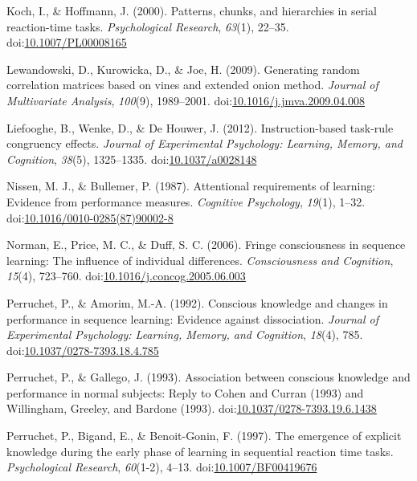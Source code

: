 \documentclass[man]{apa6}
\theoremstyle{definition}
\theoremstyle{definition}
\theoremstyle{definition}
\theoremstyle{remark}
\begin{document}
\hypertarget{ref-koch_patterns_2000}{}
Koch, I., \& Hoffmann, J. (2000). Patterns, chunks, and hierarchies in
serial reaction-time tasks. \emph{Psychological Research}, \emph{63}(1),
22--35.
doi:\href{https://doi.org/10.1007/PL00008165}{10.1007/PL00008165}

\hypertarget{ref-lewandowski_generating_2009}{}
Lewandowski, D., Kurowicka, D., \& Joe, H. (2009). Generating random
correlation matrices based on vines and extended onion method.
\emph{Journal of Multivariate Analysis}, \emph{100}(9), 1989--2001.
doi:\href{https://doi.org/10.1016/j.jmva.2009.04.008}{10.1016/j.jmva.2009.04.008}

\hypertarget{ref-liefooghe_instruction-based_2012}{}
Liefooghe, B., Wenke, D., \& De Houwer, J. (2012). Instruction-based
task-rule congruency effects. \emph{Journal of Experimental Psychology:
Learning, Memory, and Cognition}, \emph{38}(5), 1325--1335.
doi:\href{https://doi.org/10.1037/a0028148}{10.1037/a0028148}

\hypertarget{ref-nissen_attentional_1987}{}
Nissen, M. J., \& Bullemer, P. (1987). Attentional requirements of
learning: Evidence from performance measures. \emph{Cognitive
Psychology}, \emph{19}(1), 1--32.
doi:\href{https://doi.org/10.1016/0010-0285(87)90002-8}{10.1016/0010-0285(87)90002-8}

\hypertarget{ref-norman_fringe_2006}{}
Norman, E., Price, M. C., \& Duff, S. C. (2006). Fringe consciousness in
sequence learning: The influence of individual differences.
\emph{Consciousness and Cognition}, \emph{15}(4), 723--760.
doi:\href{https://doi.org/10.1016/j.concog.2005.06.003}{10.1016/j.concog.2005.06.003}

\hypertarget{ref-perruchet_conscious_1992}{}
Perruchet, P., \& Amorim, M.-A. (1992). Conscious knowledge and changes
in performance in sequence learning: Evidence against dissociation.
\emph{Journal of Experimental Psychology: Learning, Memory, and
Cognition}, \emph{18}(4), 785.
doi:\href{https://doi.org/10.1037/0278-7393.18.4.785}{10.1037/0278-7393.18.4.785}

\hypertarget{ref-perruchet_association_1993}{}
Perruchet, P., \& Gallego, J. (1993). Association between conscious
knowledge and performance in normal subjects: Reply to Cohen and Curran
(1993) and Willingham, Greeley, and Bardone (1993).
doi:\href{https://doi.org/10.1037/0278-7393.19.6.1438}{10.1037/0278-7393.19.6.1438}

\hypertarget{ref-perruchet_emergence_1997}{}
Perruchet, P., Bigand, E., \& Benoit-Gonin, F. (1997). The emergence of
explicit knowledge during the early phase of learning in sequential
reaction time tasks. \emph{Psychological Research}, \emph{60}(1-2),
4--13. doi:\href{https://doi.org/10.1007/BF00419676}{10.1007/BF00419676}
\end{document}
